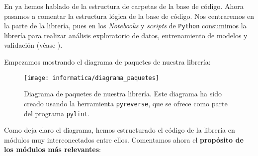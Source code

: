 En  ya hemos hablado de la estructura de carpetas de la base de código. Ahora pasamos a comentar la estructura lógica de la base de código. Nos centraremos en la parte de la librería, pues en los \textit{Notebooks} y \textit{scripts} de \lstinline{Python} consumimos la librería para realizar análisis exploratorio de datos, entrenamiento de modelos y validación (véase ).

Empezamos mostrando el diagrama de paquetes de nuestra librería:

\begin{figure}[H]
    \centering
    \texttt{[image: informatica/diagrama\_paquetes]}
    \caption{Diagrama de paquetes de nuestra librería. Este diagrama ha sido creado usando la herramienta \lstinline{pyreverse}, que se ofrece como parte del programa \lstinline{pylint}.}
\end{figure}

Como deja claro el diagrama, hemos estructurado el código de la librería en módulos muy interconectados entre ellos. Comentamos ahora el \textbf{propósito de los módulos más relevantes}:

